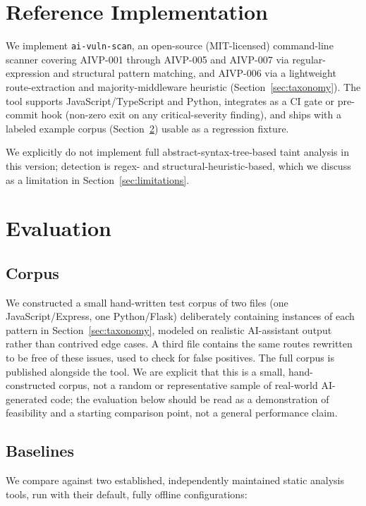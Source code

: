 \documentclass[11pt]{article}
\begin{document}
\section{Reference Implementation}
\label{sec:tool}

We implement \texttt{ai-vuln-scan}, an open-source (MIT-licensed) command-line
scanner covering AIVP-001 through AIVP-005 and AIVP-007 via regular-expression
and structural pattern matching, and AIVP-006 via a lightweight
route-extraction and majority-middleware heuristic (Section~\ref{sec:taxonomy}).
The tool supports JavaScript/TypeScript and Python, integrates as a CI gate
or pre-commit hook (non-zero exit on any critical-severity finding), and
ships with a labeled example corpus (Section~\ref{sec:evaluation}) usable
as a regression fixture.

We explicitly do not implement full abstract-syntax-tree-based taint
analysis in this version; detection is regex- and structural-heuristic-based,
which we discuss as a limitation in Section~\ref{sec:limitations}.

\section{Evaluation}
\label{sec:evaluation}

\subsection{Corpus}

We constructed a small hand-written test corpus of two files (one
JavaScript/Express, one Python/Flask) deliberately containing instances of
each pattern in Section~\ref{sec:taxonomy}, modeled on realistic
AI-assistant output rather than contrived edge cases. A third file
contains the same routes rewritten to be free of these issues, used to
check for false positives. The full corpus is published alongside the
tool. We are explicit that this is a small, hand-constructed corpus, not
a random or representative sample of real-world AI-generated code; the
evaluation below should be read as a demonstration of feasibility and a
starting comparison point, not a general performance claim.

\subsection{Baselines}

We compare against two established, independently maintained static
analysis tools, run with their default, fully offline configurations:
\end{document}
